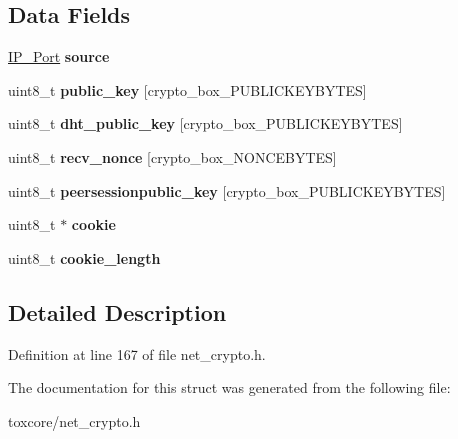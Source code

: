 \subsection*{Data Fields}
\begin{DoxyCompactItemize}
\item 
\hypertarget{struct_new___connection_afffde330c649378add9a507c9c151586}{\hyperlink{struct_i_p___port}{I\+P\+\_\+\+Port} {\bfseries source}}\label{struct_new___connection_afffde330c649378add9a507c9c151586}

\item 
\hypertarget{struct_new___connection_aaa806bb1136fb3d4b5d8d8970b596ff7}{uint8\+\_\+t {\bfseries public\+\_\+key} \mbox{[}crypto\+\_\+box\+\_\+\+P\+U\+B\+L\+I\+C\+K\+E\+Y\+B\+Y\+T\+E\+S\mbox{]}}\label{struct_new___connection_aaa806bb1136fb3d4b5d8d8970b596ff7}

\item 
\hypertarget{struct_new___connection_ab2ecaa07625ad0ed5e07d3a1f0dcc939}{uint8\+\_\+t {\bfseries dht\+\_\+public\+\_\+key} \mbox{[}crypto\+\_\+box\+\_\+\+P\+U\+B\+L\+I\+C\+K\+E\+Y\+B\+Y\+T\+E\+S\mbox{]}}\label{struct_new___connection_ab2ecaa07625ad0ed5e07d3a1f0dcc939}

\item 
\hypertarget{struct_new___connection_aae0467706f97aa3ef23e5dc9c3c199d7}{uint8\+\_\+t {\bfseries recv\+\_\+nonce} \mbox{[}crypto\+\_\+box\+\_\+\+N\+O\+N\+C\+E\+B\+Y\+T\+E\+S\mbox{]}}\label{struct_new___connection_aae0467706f97aa3ef23e5dc9c3c199d7}

\item 
\hypertarget{struct_new___connection_ac040d4ba2a22ee327952009e7396bb2f}{uint8\+\_\+t {\bfseries peersessionpublic\+\_\+key} \mbox{[}crypto\+\_\+box\+\_\+\+P\+U\+B\+L\+I\+C\+K\+E\+Y\+B\+Y\+T\+E\+S\mbox{]}}\label{struct_new___connection_ac040d4ba2a22ee327952009e7396bb2f}

\item 
\hypertarget{struct_new___connection_a78fb2cbe7af4d12847f2f044c35e7823}{uint8\+\_\+t $\ast$ {\bfseries cookie}}\label{struct_new___connection_a78fb2cbe7af4d12847f2f044c35e7823}

\item 
\hypertarget{struct_new___connection_a801672aeddedd60f76a667a2275a95ce}{uint8\+\_\+t {\bfseries cookie\+\_\+length}}\label{struct_new___connection_a801672aeddedd60f76a667a2275a95ce}

\end{DoxyCompactItemize}


\subsection{Detailed Description}


Definition at line 167 of file net\+\_\+crypto.\+h.



The documentation for this struct was generated from the following file\+:\begin{DoxyCompactItemize}
\item 
toxcore/net\+\_\+crypto.\+h\end{DoxyCompactItemize}
